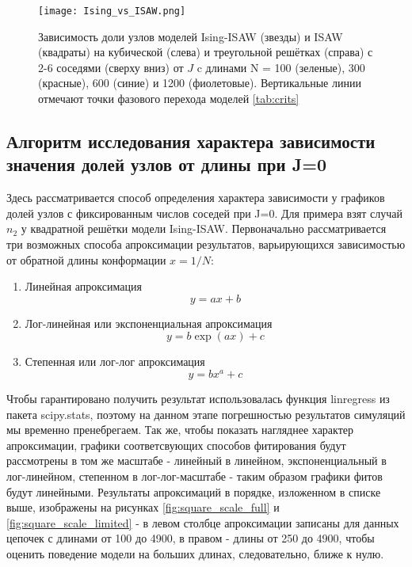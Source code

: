 \begin{figure}
    \centering
    \texttt{[image: Ising\_vs\_ISAW.png]}
    \caption{Зависимость доли узлов моделей Ising-ISAW (звезды) и ISAW (квадраты) на кубической (слева) и треугольной решётках (справа) с 2-6 соседями (сверху вниз) от $J$ c длинами N = 100 (зеленые), 300 (красные), 600 (синие) и 1200 (фиолетовые). Вертикальные линии отмечают точки фазового перехода моделей \ref{tab:crits}}
    \label{fig:Ising_vs_ISAW}
\end{figure}

\newpage

\subsection{Алгоритм исследования характера зависимости значения долей узлов от длины при J=0}

Здесь рассматривается способ определения характера зависимости у графиков долей узлов с фиксированным числов соседей при J=0. Для примера взят случай $n_{2}$ у квадратной решётки модели Ising-ISAW. Первоначально рассматривается три возможных способа апроксимации результатов, варьирующихся зависимостью от обратной длины конформации $x = 1/N$:

\begin{enumerate}
    \item Линейная апроксимация 
    \begin{equation}
    \label{eq:linreg}
        y = a x + b
    \end{equation}
    \item Лог-линейная или экспоненциальная апроксимация 
    \begin{equation}
        y = b \exp{(a x)} + c 
    \end{equation}
    \item Степенная или лог-лог апроксимация
    \begin{equation}
        y = b x^{a} + c
    \end{equation}
\end{enumerate}

Чтобы гарантировано получить результат использовалась функция linregress из пакета scipy.stats, поэтому на данном этапе погрешностью результатов симуляций мы временно пренебрегаем. Так же, чтобы показать нагляднее характер апроксимации, графики соответсвующих способов фитирования будут рассмотрены в том же масштабе - линейный в линейном, экспоненциальный в лог-линейном, степенном в лог-лог-масштабе - таким образом графики фитов будут линейными. Результаты апроксимаций в порядке, изложенном в списке выше, изображены на рисунках \ref{fig:square_scale_full} и \ref{fig:square_scale_limited} - в левом столбце апроксимации записаны для данных цепочек с длинами от 100 до 4900, в правом - длины от 250 до 4900, чтобы оценить поведение модели на больших длинах, следовательно, ближе к нулю.

